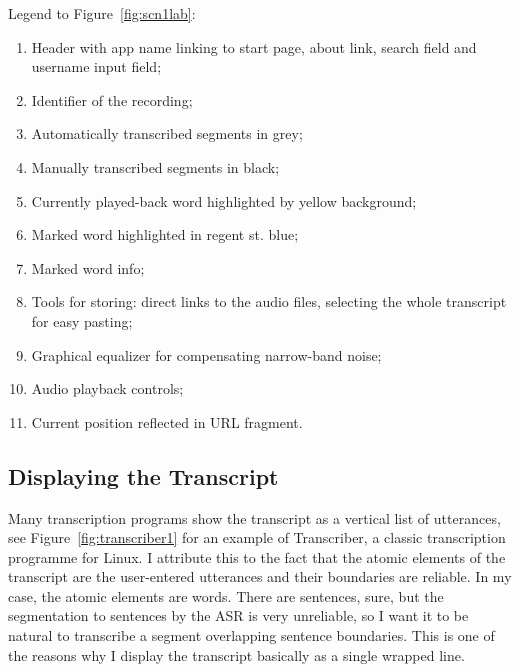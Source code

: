 \documentclass[hidelinks,12pt,a4paper]{report}
\begin{document}
Legend to Figure~\ref{fig:scn1lab}:
\begin{enumerate}
\item{
    Header with
    {app name linking to start page,}
    {about link,}
    {search field and}
    {username input field;}
}
\item{Identifier of the recording;}
\item{Automatically transcribed segments in grey;}
\item{Manually transcribed segments in black;}
\item{Currently played-back word highlighted by yellow background;}
\item{Marked word highlighted in regent st. blue;}
\item{Marked word info;}
\item{
    Tools for storing:
    {direct links to the audio files,}
    {selecting the whole transcript for easy pasting;}
}
\item{Graphical equalizer for compensating narrow-band noise;}
\item{Audio playback controls;}
\item{Current position reflected in URL fragment.}
\end{enumerate}

\subsection{Displaying the Transcript}

Many transcription programs show the transcript as a vertical list of
utterances, see Figure~\ref{fig:transcriber1} for an example of
Transcriber, a classic transcription programme for Linux. I attribute this to the fact that the atomic elements of
the transcript are the user-entered utterances and their boundaries are
reliable. In my case, the atomic elements are words. There are sentences, sure,
but the segmentation to sentences by the ASR is very unreliable, so I want it
to be natural to transcribe a segment overlapping sentence boundaries.
This is one of the reasons why I display the transcript basically as a
single wrapped line.
\end{document}
